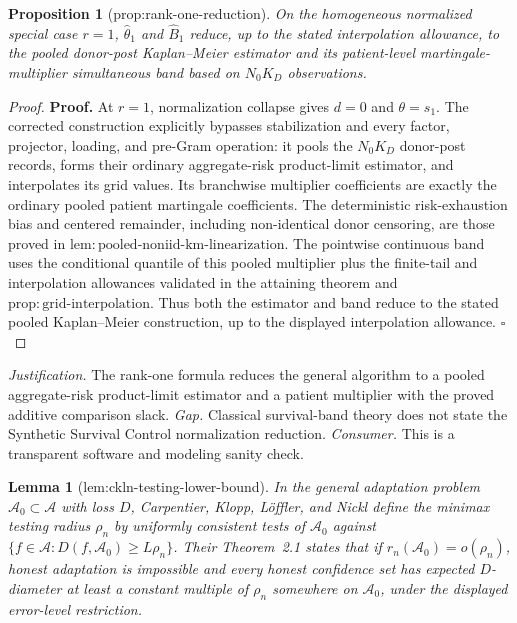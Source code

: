 \documentclass{article}
\newtheorem{lemma}{Lemma}
\newtheorem{proposition}{Proposition}
\begin{document}
\begin{proposition}[prop:rank-one-reduction]\label{prop:rank-one-reduction}
On the homogeneous normalized special case \(r=1\), \(\widehat\theta_1\) and \(\widehat B_1\) reduce, up to the stated interpolation allowance, to the pooled donor-post Kaplan--Meier estimator and its patient-level martingale-multiplier simultaneous band based on \(N_0K_D\) observations.
\end{proposition}
\begin{proof}
\textbf{Proof.}
At \(r=1\), normalization collapse gives \(d=0\) and \(\theta=s_1\).  The corrected construction explicitly bypasses stabilization and every factor, projector, loading, and pre-Gram operation: it pools the \(N_0K_D\) donor-post records, forms their ordinary aggregate-risk product-limit estimator, and interpolates its grid values.  Its branchwise multiplier coefficients are exactly the ordinary pooled patient martingale coefficients.  The deterministic risk-exhaustion bias and centered remainder, including non-identical donor censoring, are those proved in \(\mathrm{lem:pooled\mbox{-}noniid\mbox{-}km\mbox{-}linearization}\).  The pointwise continuous band uses the conditional quantile of this pooled multiplier plus the finite-tail and interpolation allowances validated in the attaining theorem and \(\mathrm{prop:grid\mbox{-}interpolation}\).  Thus both the estimator and band reduce to the stated pooled Kaplan--Meier construction, up to the displayed interpolation allowance. \(\square\)
\end{proof}
\par\smallskip\noindent \textit{Justification.} The rank-one formula reduces the general algorithm to a pooled aggregate-risk product-limit estimator and a patient multiplier with the proved additive comparison slack. \textit{Gap.} Classical survival-band theory does not state the Synthetic Survival Control normalization reduction. \textit{Consumer.} This is a transparent software and modeling sanity check.

\begin{lemma}[lem:ckln-testing-lower-bound]\label{lem:ckln-testing-lower-bound}
In the general adaptation problem \(\mathcal A_0\subset\mathcal A\) with loss \(D\), Carpentier, Klopp, L\"offler, and Nickl define the minimax testing radius \(\rho_n\) by uniformly consistent tests of \(\mathcal A_0\) against \(\{f\in\mathcal A:D(f,\mathcal A_0)\ge L\rho_n\}\).  Their Theorem~2.1 states that if \(r_n(\mathcal A_0)=o(\rho_n)\), honest adaptation is impossible and every honest confidence set has expected \(D\)-diameter at least a constant multiple of \(\rho_n\) somewhere on \(\mathcal A_0\), under the displayed error-level restriction.
\end{lemma}
\end{document}
